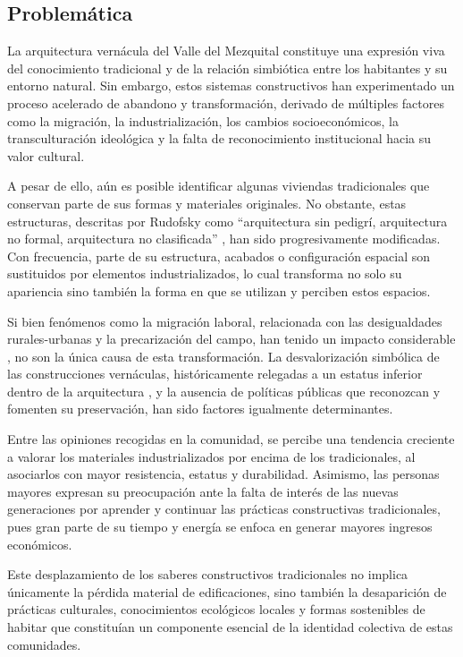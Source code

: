 \subsection{Problemática}

La arquitectura vernácula del Valle del Mezquital constituye una expresión viva del conocimiento tradicional y de la relación simbiótica entre los habitantes y su entorno natural. Sin embargo, estos sistemas constructivos han experimentado un proceso acelerado de abandono y transformación, derivado de múltiples factores como la migración, la industrialización, los cambios socioeconómicos, la transculturación ideológica y la falta de reconocimiento institucional hacia su valor cultural.

A pesar de ello, aún es posible identificar algunas viviendas tradicionales que conservan parte de sus formas y materiales originales. No obstante, estas estructuras, descritas por Rudofsky como ``arquitectura sin pedigrí, arquitectura no formal, arquitectura no clasificada'' \citep[p. 9]{rudofsky1964}, han sido progresivamente modificadas. Con frecuencia, parte de su estructura, acabados o configuración espacial son sustituidos por elementos industrializados, lo cual transforma no solo su apariencia sino también la forma en que se utilizan y perciben estos espacios.

Si bien fenómenos como la migración laboral, relacionada con las desigualdades rurales-urbanas y la precarización del campo, han tenido un impacto considerable \citep{monroy2009, boils2010dadho}, no son la única causa de esta transformación. La desvalorización simbólica de las construcciones vernáculas, históricamente relegadas a un estatus inferior dentro de la arquitectura \citep[p. 2]{torres1999revista}, y la ausencia de políticas públicas que reconozcan y fomenten su preservación, han sido factores igualmente determinantes.

Entre las opiniones recogidas en la comunidad, se percibe una tendencia creciente a valorar los materiales industrializados por encima de los tradicionales, al asociarlos con mayor resistencia, estatus y durabilidad. Asimismo, las personas mayores expresan su preocupación ante la falta de interés de las nuevas generaciones por aprender y continuar las prácticas constructivas tradicionales, pues gran parte de su tiempo y energía se enfoca en generar mayores ingresos económicos.

Este desplazamiento de los saberes constructivos tradicionales no implica únicamente la pérdida material de edificaciones, sino también la desaparición de prácticas culturales, conocimientos ecológicos locales y formas sostenibles de habitar que constituían un componente esencial de la identidad colectiva de estas comunidades.

